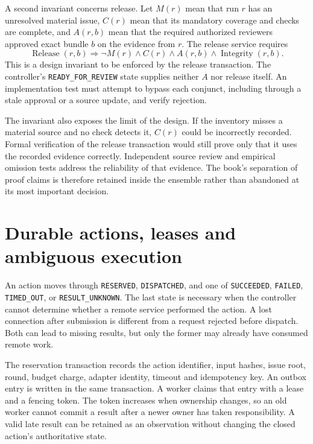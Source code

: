 \documentclass[12pt,a4paper,oneside,openany]{book}
\begin{document}
A second invariant concerns release. Let $M(r)$ mean that run $r$ has an unresolved
material issue, $C(r)$ mean that its mandatory coverage and checks are complete,
and $A(r,b)$ mean that the required authorized reviewers approved exact bundle
$b$ on the evidence from $r$. The release service requires
\begin{equation}
 \operatorname{Release}(r,b)\Longrightarrow
 \neg M(r)\land C(r)\land A(r,b)\land\operatorname{Integrity}(r,b).
 \label{eq:ensemble-release}
\end{equation}
This is a design invariant to be enforced by the release transaction. The
controller's \texttt{READY\_FOR\_REVIEW} state supplies neither $A$ nor release
itself. An implementation test must attempt to bypass each conjunct, including
through a stale approval or a source update, and verify rejection.

The invariant also exposes the limit of the design. If the inventory misses a
material source and no check detects it, $C(r)$ could be incorrectly recorded.
Formal verification of the release transaction would still prove only that it
uses the recorded evidence correctly. Independent source review and empirical
omission tests address the reliability of that evidence. The book's separation
of proof claims is therefore retained inside the ensemble rather than abandoned
at its most important decision.

\section{Durable actions, leases and ambiguous execution}
\label{merge:M06:17}


An action moves through \texttt{RESERVED}, \texttt{DISPATCHED}, and one of
\texttt{SUCCEEDED}, \texttt{FAILED}, \texttt{TIMED\_OUT}, or
\texttt{RESULT\_UNKNOWN}. The last state is necessary when the controller cannot
determine whether a remote service performed the action. A lost connection after
submission is different from a request rejected before dispatch. Both can lead
to missing results, but only the former may already have consumed remote work.

The reservation transaction records the action identifier, input hashes, issue
root, round, budget charge, adapter identity, timeout and idempotency key. An
outbox entry is written in the same transaction. A worker claims that entry with
a lease and a fencing token. The token increases when ownership changes, so an
old worker cannot commit a result after a newer owner has taken responsibility.
A valid late result can be retained as an observation without changing the closed
action's authoritative state.
\end{document}

